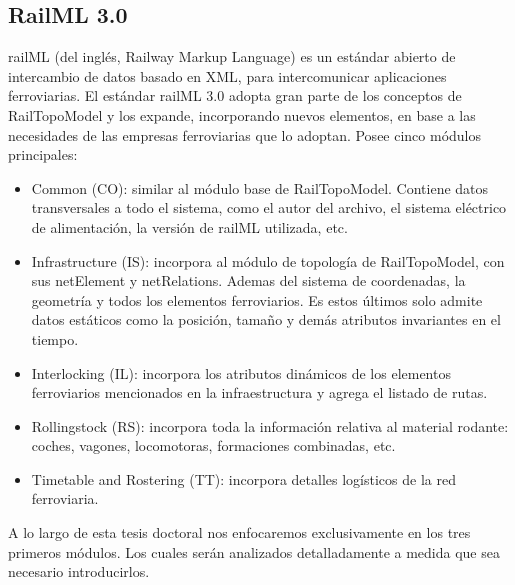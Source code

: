 \subsection{RailML 3.0}

    railML (del inglés, Railway Markup Language) es un estándar abierto de intercambio de datos basado en XML, para intercomunicar aplicaciones ferroviarias. El estándar railML 3.0 adopta gran parte de los conceptos de RailTopoModel y los expande, incorporando nuevos elementos, en base a las necesidades de las empresas ferroviarias que lo adoptan. Posee cinco módulos principales:

    \begin{itemize}
        \item Common (CO): similar al módulo base de RailTopoModel. Contiene datos transversales a todo el sistema, como el autor del archivo, el sistema eléctrico de alimentación, la versión de railML utilizada, etc.
        \item Infrastructure (IS): incorpora al módulo de topología de RailTopoModel, con sus netElement y netRelations. Ademas del sistema de coordenadas, la geometría y todos los elementos ferroviarios. Es estos últimos solo admite datos estáticos como la posición, tamaño y demás atributos invariantes en el tiempo.
        \item Interlocking (IL): incorpora los atributos dinámicos de los elementos ferroviarios mencionados en la infraestructura y agrega el listado de rutas.
        \item Rollingstock (RS): incorpora toda la información relativa al material rodante: coches, vagones, locomotoras, formaciones combinadas, etc.
        \item Timetable and Rostering (TT): incorpora detalles logísticos de la red ferroviaria.
    \end{itemize}

    A lo largo de esta tesis doctoral nos enfocaremos exclusivamente en los tres primeros módulos. Los cuales serán analizados detalladamente a medida que sea necesario introducirlos.